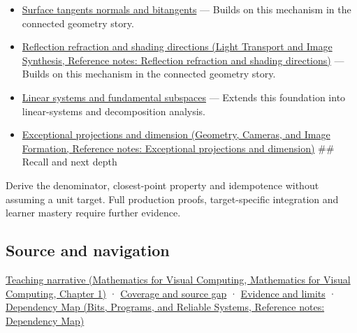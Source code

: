 \begin{itemize}
\item
  \hyperref[appendix-e31893dec985]{Surface tangents normals and bitangents} --- Builds on this mechanism in the connected geometry story.
\item
  \href{../04-Light-Transport-and-Image-Synthesis/main.pdf\#nameddest=appendix-44e00863b4d5}{Reflection refraction and shading directions (Light Transport and Image Synthesis, Reference notes: Reflection refraction and shading directions)} --- Builds on this mechanism in the connected geometry story.
\item
  \hyperref[appendix-8572a4a060c1]{Linear systems and fundamental subspaces} --- Extends this foundation into linear-systems and decomposition analysis.
\item
  \href{../03-Geometry-Cameras-and-Image-Formation/main.pdf\#nameddest=appendix-3c73f7862157}{Exceptional projections and dimension (Geometry, Cameras, and Image Formation, Reference notes: Exceptional projections and dimension)} \#\# Recall and next depth
\end{itemize}

Derive the denominator, closest-point property and idempotence without assuming a unit target. Full production proofs, target-specific integration and learner mastery require further evidence.

\subsection{Source and navigation}\label{appendix-505a502c372a-source-and-navigation}

\href{../02-Mathematics-for-Visual-Computing/main.pdf\#nameddest=01-foundations-i-ch017-projection-separates-useful-movement-from-sideways-movement}{Teaching narrative (Mathematics for Visual Computing, Mathematics for Visual Computing, Chapter 1)} · \hyperref[appendix-fd090d982a15-phase-6---parts-501-600]{Coverage and source gap} · \hyperref[appendix-a103e7846d21-phase-6---source-analysis-and-verification]{Evidence and limits} · \href{../01-Bits-Programs-and-Reliable-Systems/main.pdf\#nameddest=appendix-4ad47bdd269a}{Dependency Map (Bits, Programs, and Reliable Systems, Reference notes: Dependency Map)}
